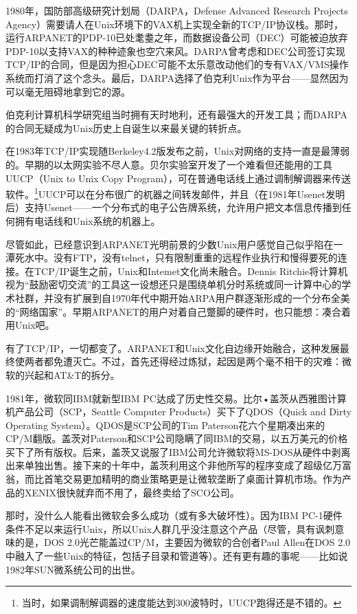 \documentclass[12pt,oneside]{book}
\begin{document}
\begin{common-format}
1980年，国防部高级研究计划局（DARPA，Defense Advanced Research Projects Agency）需要请人在Unix环境下的VAX机上实现全新的TCP/IP协议栈。那时，运行ARPANET的PDP-10已处耄耋之年，而数据设备公司（DEC）可能被迫放弃PDP-10以支持VAX的种种迹象也空穴来风。DARPA曾考虑和DEC公司签订实现TCP/IP的合同，但是因为担心DEC可能不太乐意改动他们的专有VAX/VMS操作系统\cite{Libes-Ressler}而打消了这个念头。最后，DARPA选择了伯克利Unix作为平台——显然因为可以毫无阻碍地拿到它的源\cite{Leonard}。

伯克利计算机科学研究组当时拥有天时地利，还有最强大的开发工具；而DARPA的合同无疑成为Unix历史上自诞生以来最关键的转折点。

在1983年TCP/IP实现随Berkeley4.2版发布之前，Unix对网络的支持一直是最薄弱的。早期的以太网实验不尽人意。贝尔实验室开发了一个难看但还能用的工具UUCP（Unix to Unix Copy Program），可在普通电话线上通过调制解调器来传送软件。\footnote{当时，如果调制解调器的速度能达到300波特时，UUCP跑得还是不错的。}UUCP可以在分布很广的杌器之间转发邮件，并且（在1981年Usenet发明后）支持Usenet——一个分布式的电子公告牌系统，允许用户把文本信息传播到任何拥有电话线和Unix系统的机器上。

尽管如此，已经意识到ARPANET光明前景的少数Unix用户感觉自己似乎陷在一潭死水中。没有FTP，没有telnet，只有限制重重的远程作业执行和慢得要死的连接。在TCP/IP诞生之前，Unix和Intemet文化尚未融合。Dennis Ritchie将计算机视为“鼓励密切交流”的工具这一设想还只是围绕单机分时系统或同一计算中心的学术社群，并没有扩展到自1970年代中期开始ARPA用户群逐渐形成的一个分布全美的“网络国家”。早期ARPANET的用户对着自己蹩脚的硬件时，也只能想：凑合着用Unix吧。

有了TCP/IP，一切都变了。ARPANET和Unix文化自边缘开始融合，这种发展最终使两者都免遭灭亡。不过，首先还得经过炼狱，起因是两个毫不相干的灾难：微软的兴起和AT\&{}T的拆分。

1981年，微软同IBM就新型IBM PC达成了历史性交易。比尔•盖茨从西雅图计算机产品公司（SCP，Seattle Computer Products）买下了QDOS（Quick and Dirty Operating System）。QDOS是SCP公司的Tim Paterson花六个星期凑出来的CP/M翻版。盖茨对Paterson和SCP公司隐瞒了同IBM的交易，以五万美元的价格买下了所有版权。后来，盖茨又说服了IBM公司允许微软将MS-DOS从硬件中剥离出来单独出售。接下来的十年中，盖茨利用这个非他所写的程序变成了超级亿万富翁，而比首笔交易更加精明的商业策略更是让微软垄断了桌面计算机市场。作为产品的XENIX很快就弃而不用了，最终卖给了SCO公司。

那时，没什么人能看出微软会多么成功（或有多大破坏性）。因为IBM PC-1硬件条件不足以来运行Unix，所以Unix人群几乎没注意这个产品（尽管，具有讽刺意味的是，DOS 2.0光芒能盖过CP/M，主要因为微软的合创者Paul Allen在DOS 2.0中融入了一些Unix的特征，包括子目录和管道等）。还有更有趣的事呢——比如说1982年SUN微系统公司的出世。


\end{common-format}
\end{document}
